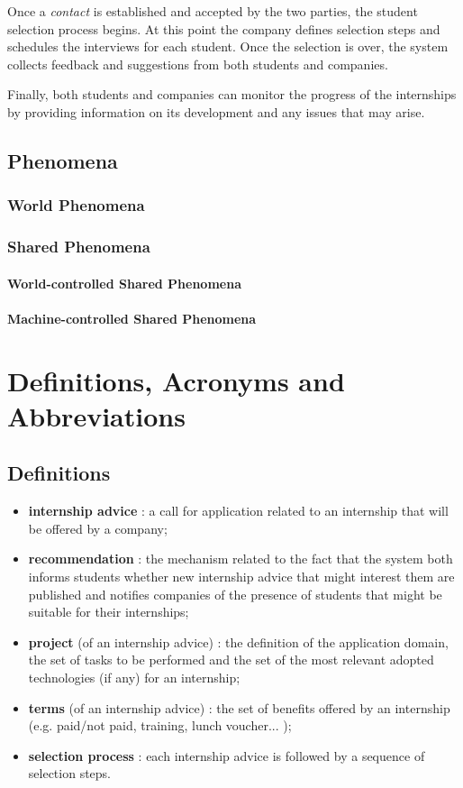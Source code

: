 		Once a \emph{contact} is established and accepted by the two parties, the student selection process begins. At this point the company defines selection steps and schedules the interviews for each student. Once the selection is over, the system collects feedback and suggestions from both students and companies.
		
		Finally, both students and companies can monitor the progress of the internships by providing information on its development and any issues that may arise.
		\subsection{Phenomena}
			\subsubsection{World Phenomena}
			\subsubsection{Shared Phenomena}
				\paragraph{World-controlled Shared Phenomena}
				\paragraph{Machine-controlled Shared Phenomena}
	\section{Definitions, Acronyms and Abbreviations}
		\subsection{Definitions}
			\begin{itemize}
				\item \textbf{internship advice} : a call for application related to an internship that will be offered by a company;
				\item \textbf{recommendation} : the mechanism related to the fact that the system both informs students whether new internship advice that might interest them are published and notifies companies of the presence of students that might be suitable for their internships;
				\item \textbf{project} (of an internship advice) : the definition of the application domain, the set of tasks to be performed and the set of the most relevant adopted technologies (if any) for an internship;
				\item \textbf{terms} (of an internship advice) : the set of benefits offered by an internship (e.g. paid/not paid, training, lunch voucher... );
				\item \textbf{selection process} : each internship advice is followed by a sequence of selection steps.
			\end{itemize}
